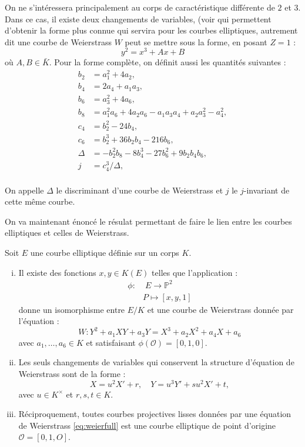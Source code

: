 \documentclass[a4paper]{article} %
\numberwithin{section}{part}
\numberwithin{equation}{section}
\newcommand\EO{\mathcal{O}}
\newcommand\PP[1]{\mathbb{P}^{#1}}
\begin{document}
On ne s'intéressera principalement au corps de caractéristique différente de $2$
et $3$. Dans ce cas, il existe deux changements de variables, (voir \cite[Chap. 
III,p.~42]{Sil} qui permettent d'obtenir la forme plus connue qui servira pour 
les courbes elliptiques, autrement dit une courbe de Weierstrass $W$ peut se 
mettre sous la forme, en posant $Z = 1$ :
\begin{equation}
\label{eq:weiersimpl}
y^2 = x^3 + Ax + B
\end{equation}
où $A, B\in\bar{K}$. Pour la forme complète, on définit aussi les
quantités suivantes :
\begin{align*}
b_2 &= a_1^2 + 4a_2,\\
b_4 &= 2a_4 + a_1a_3,\\
b_6 &= a_3^2 + 4a_6,\\
b_8 &= a_1^2a_6 + 4a_2a_6 - a_1a_3a_4 + a_2a_3^2 - a_4^2,\\
c_4 &= b_2^2 - 24b_4,\\
c_6 &= b_2^3 + 36b_2b_4 - 216b_6,\\
\Delta &= -b_2^2b_8 - 8b_4^3 - 27b_6^2 + 9b_2b_4b_6,\\
j &= c_4^3/\Delta,\\
\end{align*}

\begin{defn}
On appelle $\Delta$ le discriminant d'une courbe de Weierstrass et $j$ le
$j$-invariant de cette même courbe.
\end{defn}

On va maintenant énoncé le résulat permettant de faire le lien entre les courbes
elliptiques et celles de Weierstrass.

\begin{prop}
Soit $E$ une courbe elliptique définie sur un corps $K$.
\begin{enumerate}[(i)]
\item Il existe des fonctions $x, y\in K(E)$ telles que l'application :
\begin{align*}
\phi :&\;E \longrightarrow \PP{2}\\
&P \longmapsto [x,y,1]
\end{align*}
donne un isomorphisme entre $E/K$ et une courbe de Weierstrass donnée par
l'équation :
\[W : Y^2 + a_1XY + a_3Y = X^3 + a_2X^2 + a_4X + a_6\]
avec $a_1,\dots,a_6\in K$ et satisfaisant $\phi(\EO) = [0, 1, 0]$.

\item Les seuls changements de variables qui conservent la structure d'équation
de Weierstrass sont de la forme :
\[X = u^2X' + r, \quad Y = u^3Y' + su^2X' + t,\]
avec $u\in K^{\times}$ et $r,s,t\in K$.

\item Réciproquement, toutes courbes projectives lisses données par une équation
de Weierstrass \ref{eq:weierfull} est une courbe elliptique de point d'origine
$\EO = [0, 1, O]$.
\end{enumerate}
\end{prop}
\end{document}

